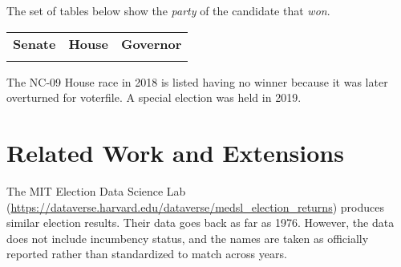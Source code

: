 \documentclass[12pt]{article}
\begin{document}
The set of tables below show the \emph{party} of the candidate that \emph{won}. 

    \begin{tabularx}{\linewidth}{CCC}
    \textbf{Senate} & \textbf{House} & \textbf{Governor}\\
     &  & 
    \end{tabularx}

The NC-09 House race in 2018 is listed having no winner because it was later overturned for voterfile. A special election was held in 2019.

	



\section{Related Work and Extensions}

The MIT Election Data Science Lab (\url{https://dataverse.harvard.edu/dataverse/medsl\_election\_returns}) produces similar election results. Their data goes back as far as 1976. However, the data does not include incumbency status, and the names are taken as officially reported rather than standardized to match across years.
\end{document}

